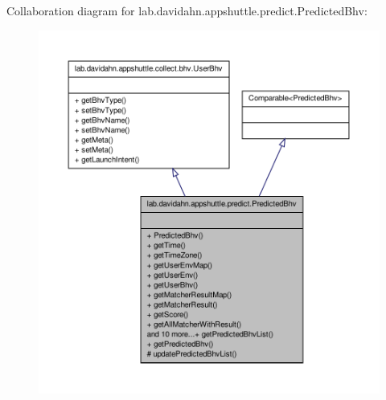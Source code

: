 \-Collaboration diagram for lab.\-davidahn.\-appshuttle.\-predict.\-Predicted\-Bhv\-:
\nopagebreak
\begin{figure}[H]
\begin{center}
\leavevmode
\includegraphics[width=350pt]{classlab_1_1davidahn_1_1appshuttle_1_1predict_1_1_predicted_bhv__coll__graph}
\end{center}
\end{figure}
